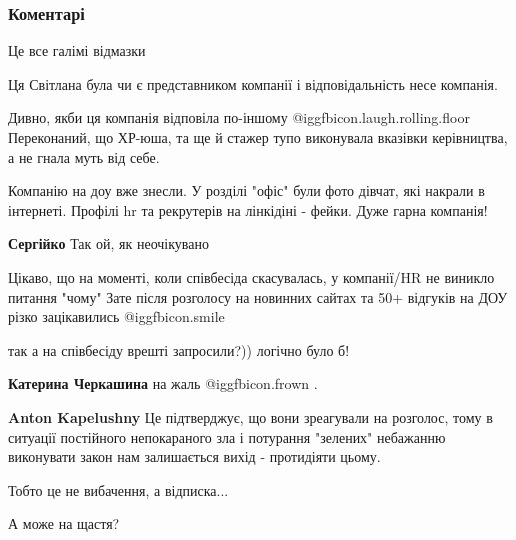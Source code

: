  
 
 
 
 
\subsubsection{Коментарі}

\begin{itemize} %
Це все галімі відмазки

Ця Світлана була чи є представником компанії і відповідальність несе компанія.

Дивно, якби ця компанія відповіла по-іншому  @igg{fbicon.laugh.rolling.floor}  Переконаний, що ХР-юша, та ще й стажер тупо виконувала вказівки керівництва, а не гнала муть від себе.

Компанію на доу вже знесли. У розділі "офіс" були фото дівчат, які накрали в інтернеті. Профілі hr та рекрутерів на лінкідіні - фейки.
Дуже гарна компанія!

\begin{itemize} %
\textbf{Сергійко} Так ой, як неочікувано
\end{itemize} %

Цікаво, що на моменті, коли співбесіда скасувалась, у компанії/HR не виникло питання "чому"
Зате після розголосу на новинних сайтах та 50+ відгуків на ДОУ різко зацікавились  @igg{fbicon.smile} 

так а на співбесіду врешті запросили?)) логічно було б!

\begin{itemize} %
\textbf{Катерина Черкашина} на жаль  @igg{fbicon.frown} .

\textbf{Anton Kapelushny} Це підтверджує, що вони зреагували на розголос, тому в ситуації постійного непокараного зла і потурання "зелених" небажанню виконувати закон нам залишається вихід - протидіяти цьому.

Тобто це не вибачення, а відписка...

А може на щастя?


\end{itemize}
\end{itemize}
